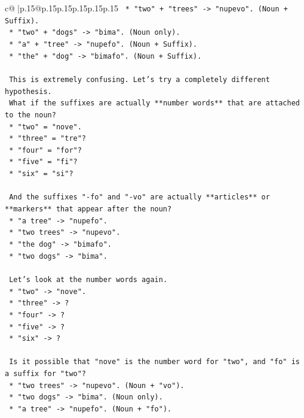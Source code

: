 \documentclass{article}
\begin{document}
{\begin{supertabular}{c@{$\;$}|p{.15\linewidth}@{}p{.15\linewidth}p{.15\linewidth}p{.15\linewidth}p{.15\linewidth}p{.15\linewidth}}
{{{\texttt{    *   "two" + "trees" {-}> "nupevo". (Noun + Suffix).} \\
\texttt{    *   "two" + "dogs" {-}> "bima". (Noun only).} \\
\texttt{    *   "a" + "tree" {-}> "nupefo". (Noun + Suffix).} \\
\texttt{    *   "the" + "dog" {-}> "bimafo". (Noun + Suffix).} \\
\\ 
\texttt{    This is extremely confusing. Let's try a completely different hypothesis.} \\
\texttt{    What if the suffixes are actually **number words** that are attached to the noun?} \\
\texttt{    *   "two" = "nove".} \\
\texttt{    *   "three" = "tre"?} \\
\texttt{    *   "four" = "for"?} \\
\texttt{    *   "five" = "fi"?} \\
\texttt{    *   "six" = "si"?} \\
\\ 
\texttt{    And the suffixes "{-}fo" and "{-}vo" are actually **articles** or **markers** that appear after the noun?} \\
\texttt{    *   "a tree" {-}> "nupefo".} \\
\texttt{    *   "two trees" {-}> "nupevo".} \\
\texttt{    *   "the dog" {-}> "bimafo".} \\
\texttt{    *   "two dogs" {-}> "bima".} \\
\\ 
\texttt{    Let's look at the number words again.} \\
\texttt{    *   "two" {-}> "nove".} \\
\texttt{    *   "three" {-}> ?} \\
\texttt{    *   "four" {-}> ?} \\
\texttt{    *   "five" {-}> ?} \\
\texttt{    *   "six" {-}> ?} \\
\\ 
\texttt{    Is it possible that "nove" is the number word for "two", and "fo" is a suffix for "two"?} \\
\texttt{    *   "two trees" {-}> "nupevo". (Noun + "vo").} \\
\texttt{    *   "two dogs" {-}> "bima". (Noun only).} \\
\texttt{    *   "a tree" {-}> "nupefo". (Noun + "fo").} \\
}}}
\end{supertabular}}
\end{document}
